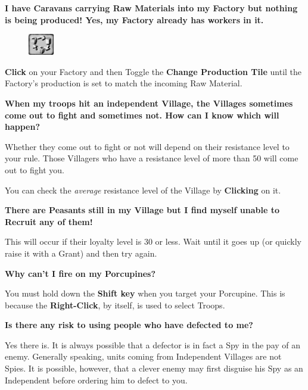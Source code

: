 {\large \textbf{\textsf{I have Caravans carrying Raw Materials into my Factory but nothing is being produced! Yes, my Factory already has workers in it.}}}

\begin{figure}
    \vspace{-20pt}
    \begin{center}
        \includegraphics[width=0.1\textwidth]{Tgoodcycling}
    \end{center}
    \vspace{-20pt}
\end{figure}

\textbf{Click} on your Factory and then Toggle the \textbf{Change Production Tile} until the Factory’s production is set to match the incoming Raw Material.

{\large \textbf{\textsf{When my troops hit an independent Village, the Villages sometimes come out to fight and sometimes not. How can I know which will happen?}}}

Whether they come out to fight or not will depend on their resistance level to your rule. Those Villagers who have a resistance level of more than 50 will come out to fight you.

You can check the \textit{average} resistance level of the Village by \textbf{Clicking} on it.

{\large \textbf{\textsf{There are Peasants still in my Village but I find myself unable to Recruit any of them!}}}

This will occur if their loyalty level is 30 or less. Wait until it goes up (or quickly raise it with a Grant) and then try again.

{\large \textbf{\textsf{Why can’t I fire on my Porcupines?}}}


You must hold down the \textbf{Shift key} when you target your Porcupine. This is because the \textbf{Right-Click}, by itself, is used to select Troops.

{\large \textbf{\textsf{Is there any risk to using people who have defected to me?}}}

Yes there is. It is always possible that a defector is in fact a Spy in the pay of an enemy. Generally speaking, units coming from Independent Villages are not Spies. It is possible, however, that a clever enemy may first disguise his Spy as an Independent before ordering him to defect to you.

